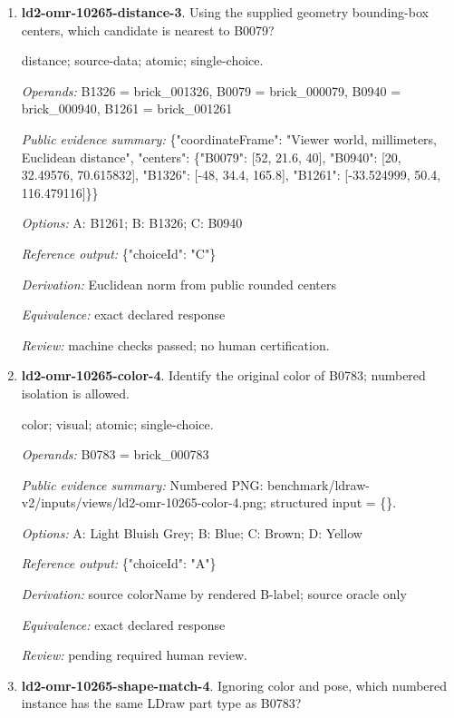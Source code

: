 \begin{enumerate}
\item \textbf{ld2-omr-10265-distance-3}. Using the supplied geometry bounding-box centers, which candidate is nearest to B0079?
\par{\small distance; source-data; atomic; single-choice.\par\textit{Operands:} B1326 = brick\_001326, B0079 = brick\_000079, B0940 = brick\_000940, B1261 = brick\_001261\par\textit{Public evidence summary:} \{"coordinateFrame": "Viewer world, millimeters, Euclidean distance", "centers": \{"B0079": [52, 21.6, 40], "B0940": [20, 32.49576, 70.615832], "B1326": [-48, 34.4, 165.8], "B1261": [-33.524999, 50.4, 116.479116]\}\}\par\textit{Options:} A: B1261; B: B1326; C: B0940\par\textit{Reference output:} \{"choiceId": "C"\}\par\textit{Derivation:} Euclidean norm from public rounded centers\par\textit{Equivalence:} exact declared response\par\textit{Review:} machine checks passed; no human certification.}
\item \textbf{ld2-omr-10265-color-4}. Identify the original color of B0783; numbered isolation is allowed.
\par{\small color; visual; atomic; single-choice.\par\textit{Operands:} B0783 = brick\_000783\par\textit{Public evidence summary:} Numbered PNG: benchmark/ldraw-v2/inputs/views/ld2-omr-10265-color-4.png; structured input = \{\}.\par\textit{Options:} A: Light Bluish Grey; B: Blue; C: Brown; D: Yellow\par\textit{Reference output:} \{"choiceId": "A"\}\par\textit{Derivation:} source colorName by rendered B-label; source oracle only\par\textit{Equivalence:} exact declared response\par\textit{Review:} pending required human review.}
\item \textbf{ld2-omr-10265-shape-match-4}. Ignoring color and pose, which numbered instance has the same LDraw part type as B0783?

\end{enumerate}
